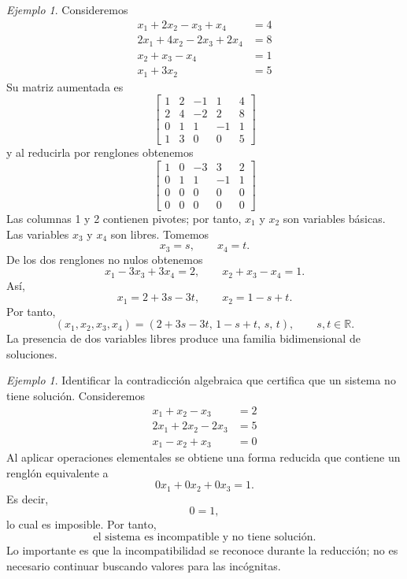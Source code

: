 \documentclass[12pt]{article}
\theoremstyle{remark}
\newtheorem{Ejem}[definicion]{Ejemplo}
\newcommand{\R}{\mathbb{R}}
\begin{document}
\begin{Ejem}

Consideremos
\[
\begin{aligned}
x_{1} + 2 x_{2} - x_{3} + x_{4} &= 4\\
2 x_{1} + 4 x_{2} - 2 x_{3} + 2 x_{4} &= 8\\
x_{2} + x_{3} - x_{4} &= 1\\
x_{1} + 3 x_{2} &= 5
\end{aligned}
\]
Su matriz aumentada es
\[
\left[\begin{array}{cccc|c}
1 & 2 & -1 & 1 & 4\\
2 & 4 & -2 & 2 & 8\\
0 & 1 & 1 & -1 & 1\\
1 & 3 & 0 & 0 & 5
\end{array}\right]
\]
y al reducirla por renglones obtenemos
\[
\left[\begin{array}{cccc|c}
1 & 0 & -3 & 3 & 2\\
0 & 1 & 1 & -1 & 1\\
0 & 0 & 0 & 0 & 0\\
0 & 0 & 0 & 0 & 0
\end{array}\right]
\]
Las columnas 1 y 2 contienen pivotes; por tanto, \(x_1\) y \(x_2\) son variables básicas. Las variables
\(x_3\) y \(x_4\) son libres. Tomemos
\[
x_3=s,\qquad x_4=t.
\]
De los dos renglones no nulos obtenemos
\[
x_1-3x_3+3x_4=2,\qquad x_2+x_3-x_4=1.
\]
Así,
\[
x_1=2+3s-3t,\qquad x_2=1-s+t.
\]
Por tanto,
\[
\boxed{(x_1,x_2,x_3,x_4)=(2+3s-3t,\,1-s+t,\,s,\,t),\qquad s,t\in\R.}
\]
La presencia de dos variables libres produce una familia bidimensional de soluciones.
\end{Ejem}
\begin{Ejem}

Identificar la contradicción algebraica que certifica que un sistema no tiene solución. Consideremos
\[
\begin{aligned}
x_{1} + x_{2} - x_{3} &= 2\\
2 x_{1} + 2 x_{2} - 2 x_{3} &= 5\\
x_{1} - x_{2} + x_{3} &= 0
\end{aligned}
\]
Al aplicar operaciones elementales se obtiene una forma reducida que contiene un renglón equivalente a
\[
0x_1+0x_2+0x_3=1.
\]
Es decir,
\[
0=1,
\]
lo cual es imposible. Por tanto,
\[
\boxed{\text{el sistema es incompatible y no tiene solución}.}
\]
Lo importante es que la incompatibilidad se reconoce durante la reducción; no es necesario continuar buscando valores para las incógnitas.
\end{Ejem}
\end{document}
